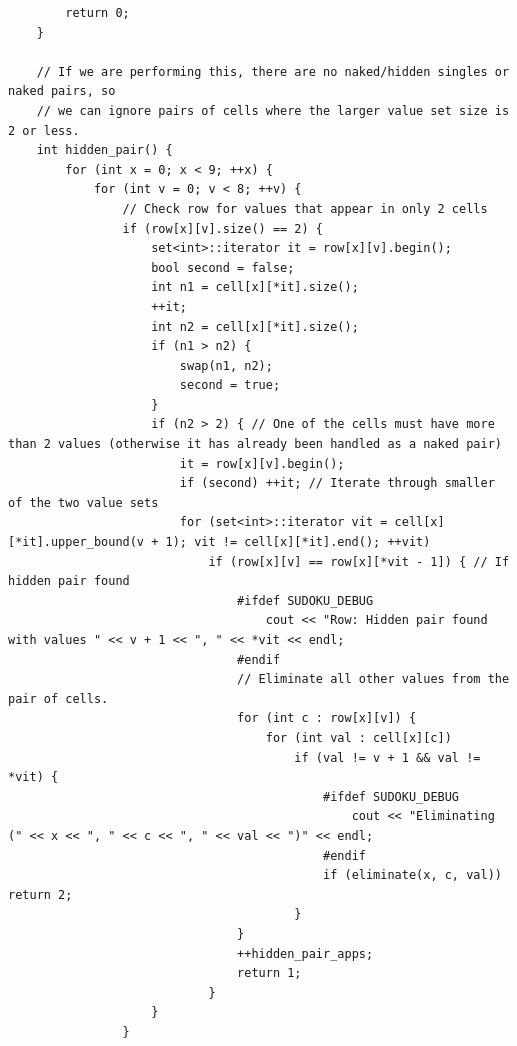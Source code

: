 \documentclass{article}
\begin{document}
\begin{lstlisting}
        return 0;
    }

    // If we are performing this, there are no naked/hidden singles or naked pairs, so
    // we can ignore pairs of cells where the larger value set size is 2 or less.
    int hidden_pair() {
        for (int x = 0; x < 9; ++x) {
            for (int v = 0; v < 8; ++v) {
                // Check row for values that appear in only 2 cells
                if (row[x][v].size() == 2) {
                    set<int>::iterator it = row[x][v].begin();
                    bool second = false;
                    int n1 = cell[x][*it].size();
                    ++it;
                    int n2 = cell[x][*it].size();
                    if (n1 > n2) {
                        swap(n1, n2);
                        second = true;
                    }
                    if (n2 > 2) { // One of the cells must have more than 2 values (otherwise it has already been handled as a naked pair)
                        it = row[x][v].begin();
                        if (second) ++it; // Iterate through smaller of the two value sets
                        for (set<int>::iterator vit = cell[x][*it].upper_bound(v + 1); vit != cell[x][*it].end(); ++vit)
                            if (row[x][v] == row[x][*vit - 1]) { // If hidden pair found
                                #ifdef SUDOKU_DEBUG
                                    cout << "Row: Hidden pair found with values " << v + 1 << ", " << *vit << endl;
                                #endif
                                // Eliminate all other values from the pair of cells.
                                for (int c : row[x][v]) {
                                    for (int val : cell[x][c])
                                        if (val != v + 1 && val != *vit) {
                                            #ifdef SUDOKU_DEBUG
                                                cout << "Eliminating (" << x << ", " << c << ", " << val << ")" << endl;
                                            #endif
                                            if (eliminate(x, c, val)) return 2;
                                        }
                                }
                                ++hidden_pair_apps;
                                return 1;
                            }
                    }
                }


\end{lstlisting}
\end{document}
